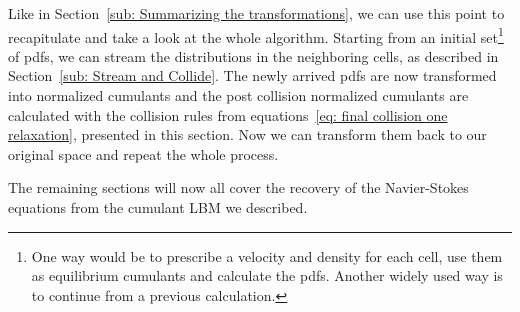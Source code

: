 
Like in Section~\ref{sub: Summarizing the transformations}, we can use this point to recapitulate and take a look at the whole algorithm.
Starting from an initial set\footnote{
One way would be to prescribe a velocity and density for each cell, use them as equilibrium cumulants and calculate the \glspl{pdf}.
Another widely used way is to continue from a previous calculation.
} of \glspl{pdf}, we can stream the distributions in the neighboring cells, as described in Section~\ref{sub: Stream and Collide}.
The newly arrived \glspl{pdf} are now transformed into normalized cumulants and the post collision normalized cumulants are calculated with the collision rules from equations~\eqref{eq: final collision one relaxation}, presented in this section.
Now we can transform them back to our original space and repeat the whole process.

The remaining sections will now all cover the recovery of the Navier-Stokes equations from the cumulant LBM we described.
